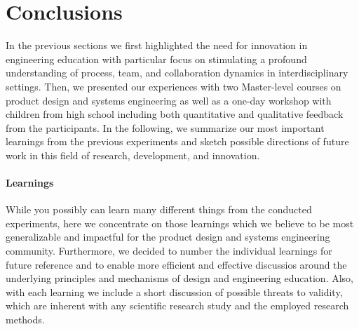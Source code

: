 \documentclass{PDS}
\begin{document}
\section{Conclusions}
\label{sec:conclusion}

In the previous sections we first highlighted the need for innovation in engineering education with particular focus on stimulating a profound understanding of process, team, and collaboration dynamics in interdisciplinary settings.
Then, we presented our experiences with two Master-level courses on product design and systems engineering as well as a one-day workshop with children from high school including both quantitative and qualitative feedback from the participants.
In the following, we summarize our most important learnings from the previous experiments and sketch possible directions of future work in this field of research, development, and innovation.

\paragraph{Learnings}

While you possibly can learn many different things from the conducted experiments, here we concentrate on those learnings which we believe to be most generalizable and impactful for the product design and systems engineering community.
Furthermore, we decided to number the individual learnings for future reference and to enable more efficient and effective discussios around the underlying principles and mechanisms of design and engineering education.
Also, with each learning we include a short discussion of possible threats to validity, which are inherent with any scientific research study and the employed research methods.
\end{document}
